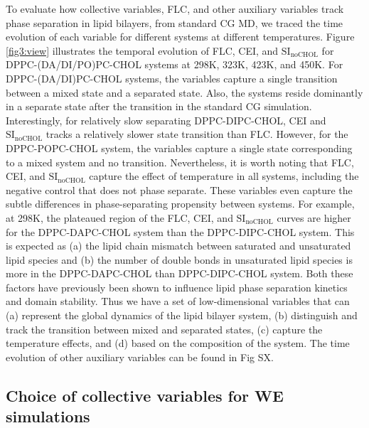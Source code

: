 \documentclass{biophys-new}
\begin{document}
To evaluate how collective variables, FLC, and other auxiliary variables track phase separation in lipid bilayers,
from standard CG MD, we traced the time evolution of each variable for different systems at different temperatures.
Figure \ref{fig3:view} illustrates the temporal evolution of FLC, CEI, and $\text{SI}_{\text{noCHOL}}$ for DPPC-(DA/DI/PO)PC-CHOL systems at 298K, 323K, 423K, and 450K.
For DPPC-(DA/DI)PC-CHOL systems, the variables capture a single transition between a mixed state and a separated state.
Also, the systems reside dominantly in a separate state after the transition in the standard CG simulation.
Interestingly, for relatively slow separating DPPC-DIPC-CHOL, CEI and $\text{SI}_{\text{noCHOL}}$ tracks a relatively slower state transition than FLC.
However, for the DPPC-POPC-CHOL system, the variables capture a single state corresponding to a mixed system and no transition.
Nevertheless, it is worth noting that FLC, CEI, and $\text{SI}_{\text{noCHOL}}$ capture the effect of temperature in all systems, including the negative control that does not phase separate.
These variables even capture the subtle differences in phase-separating propensity between systems.
For example, at 298K, the plateaued region of the FLC, CEI, and $\text{SI}_{\text{noCHOL}}$ curves are higher for the DPPC-DAPC-CHOL system than the DPPC-DIPC-CHOL system.
This is expected as (a) the lipid chain mismatch between saturated and unsaturated lipid species and (b) the number of double bonds in unsaturated lipid species is more in the DPPC-DAPC-CHOL than DPPC-DIPC-CHOL system.
Both these factors have previously been shown to influence lipid phase separation kinetics and domain stability\cite {Fowler2016, Lin2016}.
Thus we have a set of low-dimensional variables that can (a) represent the global dynamics of the lipid bilayer system,
(b) distinguish and track the transition between mixed and separated states, (c) capture the temperature effects,
and (d) based on the composition of the system.
The time evolution of other auxiliary variables can be found in Fig SX.
\\

\subsection*{Choice of collective variables for WE simulations}
\end{document}
